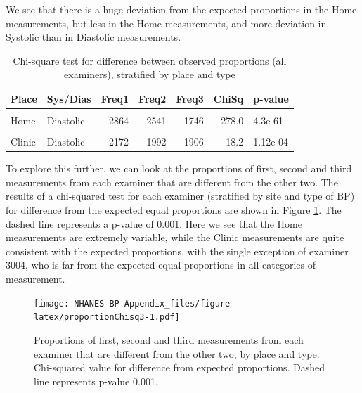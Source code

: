\documentclass[
]{article}
\begin{document}
We see that there is a huge deviation from the expected proportions in the Home measurements, but less in the Home measurements, and more deviation in Systolic than in Diastolic measurements.

\begin{table}[!h]

\caption{\label{tab:proportionChisq}Chi-square test for difference between observed proportions (all examiners), stratified by place and type}
\centering
\begin{tabular}[t]{llrrrrl}
\toprule
Place & Sys/Dias & Freq1 & Freq2 & Freq3 & ChiSq & p-value\\
\midrule
\cellcolor{gray!6}{Home} & \cellcolor{gray!6}{Systolic} & \cellcolor{gray!6}{2657} & \cellcolor{gray!6}{2149} & \cellcolor{gray!6}{1522} & \cellcolor{gray!6}{306.0} & \cellcolor{gray!6}{3.57e-67}\\
Home & Diastolic & 2864 & 2541 & 1746 & 278.0 & 4.3e-61\\
\cellcolor{gray!6}{Clinic} & \cellcolor{gray!6}{Systolic} & \cellcolor{gray!6}{1905} & \cellcolor{gray!6}{1702} & \cellcolor{gray!6}{1594} & \cellcolor{gray!6}{28.8} & \cellcolor{gray!6}{5.57e-07}\\
Clinic & Diastolic & 2172 & 1992 & 1906 & 18.2 & 1.12e-04\\
\bottomrule
\end{tabular}
\end{table}

To explore this further, we can look at the proportions of first, second and third measurements from each examiner that are different from the other two.
The results of a chi-squared test for each examiner (stratified by site and type of BP) for difference from the expected equal proportions are shown in Figure \ref{fig:proportionChisq3}.
The dashed line represents a p-value of 0.001.
Here we see that the Home measurements are extremely variable, while the Clinic measurements are quite consistent with the expected proportions, with the single exception of examiner 3004, who is far from the expected equal proportions in all categories of measurement.

\begin{figure}
\centering
\texttt{[image: NHANES-BP-Appendix\_files/figure-latex/proportionChisq3-1.pdf]}
\caption{\label{fig:proportionChisq3}Proportions of first, second and third measurements from each examiner that are different from the other two, by place and type. Chi-squared value for difference from expected proportions. Dashed line represents p-value 0.001.}
\end{figure}
\end{document}
